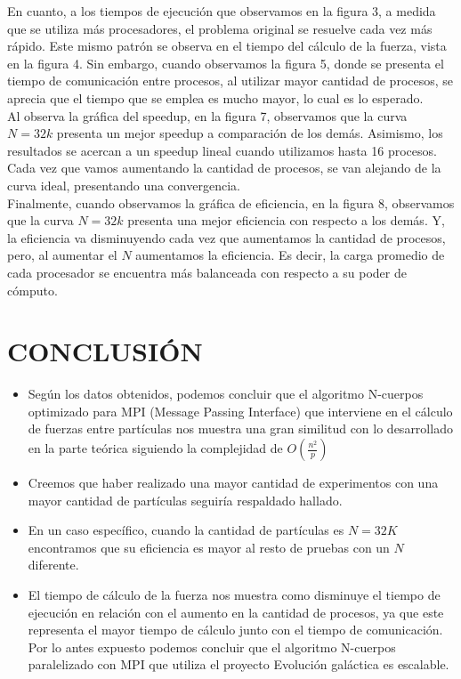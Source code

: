 \documentclass[conference]{IEEEtran}
\begin{document}
En cuanto, a los tiempos de ejecución que observamos en la figura 3, a medida que se utiliza más procesadores, el problema original se resuelve cada vez más rápido. Este mismo patrón se observa en el tiempo del cálculo de la fuerza, vista en la figura 4. Sin embargo, cuando observamos la figura 5, donde se presenta el tiempo de comunicación entre procesos, al utilizar mayor cantidad de procesos, se aprecia que el tiempo que se emplea es mucho mayor, lo cual es lo esperado. \\

Al observa la gráfica del speedup, en la figura 7, observamos que la curva $N = 32k$ presenta un mejor speedup a comparación de los demás. Asimismo, los resultados se acercan a un speedup lineal cuando utilizamos hasta 16 procesos. Cada vez que vamos aumentando la cantidad de procesos, se van alejando de la curva ideal, presentando una convergencia. \\

Finalmente, cuando observamos la gráfica de eficiencia, en la figura 8, observamos que la curva $N = 32k$ presenta una mejor eficiencia con respecto a los demás. Y, la eficiencia va disminuyendo cada vez que aumentamos la cantidad de procesos, pero, al aumentar el $N$ aumentamos la eficiencia. Es decir, la carga promedio de cada procesador se encuentra más balanceada con respecto a su poder de cómputo.

\section{CONCLUSIÓN}
\begin{itemize}
    \item Según los datos obtenidos, podemos concluir que el algoritmo N-cuerpos optimizado para MPI (Message Passing Interface) que interviene en el cálculo de fuerzas entre partículas nos muestra una gran similitud con lo desarrollado en la parte teórica siguiendo la complejidad de $O(\frac{n^2}{p})$
    \item Creemos que haber realizado una mayor cantidad de experimentos con una mayor cantidad de partículas seguiría respaldado hallado.
    \item En un caso específico, cuando la cantidad de partículas es $N = 32K$ encontramos que su eficiencia es mayor al resto de pruebas con un $N$ diferente.
    \item El tiempo de cálculo de la fuerza nos muestra como disminuye el tiempo de ejecución en relación con el aumento en la cantidad de procesos, ya que este representa el mayor tiempo de cálculo junto con el tiempo de comunicación. Por lo antes expuesto podemos concluir que el algoritmo N-cuerpos paralelizado con MPI que utiliza el proyecto Evolución galáctica es escalable.
\end{itemize}
\end{document}
